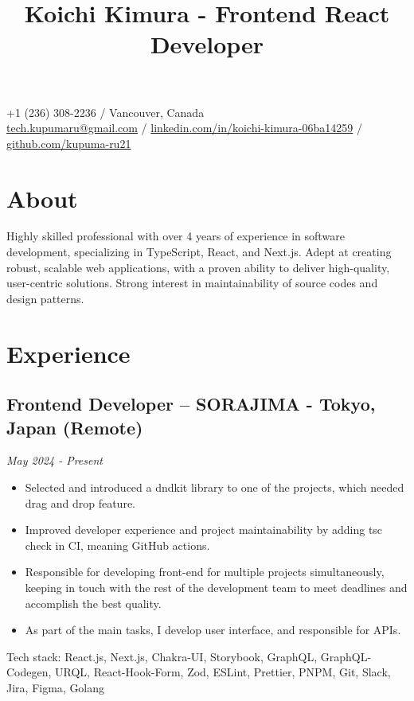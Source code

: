 \documentclass{article}
\title{Koichi Kimura - Frontend React Developer}
\date{}
\begin{document}
\maketitle

\begin{center}
+1 (236) 308-2236 / Vancouver, Canada \\
\href{mailto:tech.kupumaru@gmail.com}{tech.kupumaru@gmail.com} /
\href{https://www.linkedin.com/in/koichi-kimura-06ba14259}{linkedin.com/in/koichi-kimura-06ba14259} /
\href{https://github.com/kupuma-ru21}{github.com/kupuma-ru21}
\end{center}

\section*{About}
Highly skilled professional with over 4 years of experience in software development, specializing in TypeScript, React, and Next.js. Adept at creating robust, scalable web applications, with a proven ability to deliver high-quality, user-centric solutions. Strong interest in maintainability of source codes and design patterns.

\section*{Experience}

\subsection*{Frontend Developer – SORAJIMA - Tokyo, Japan (Remote)}
\textit{May 2024 - Present}
\begin{itemize}[leftmargin=*, itemsep=0pt]
    \item Selected and introduced a dndkit library to one of the projects, which needed drag and drop feature.
    \item Improved developer experience and project maintainability by adding tsc check in CI, meaning GitHub actions.
    \item Responsible for developing front-end for multiple projects simultaneously, keeping in touch with the rest of the development team to meet deadlines and accomplish the best quality.
    \item As part of the main tasks, I develop user interface, and responsible for APIs.
\end{itemize}
Tech stack: React.js, Next.js, Chakra-UI, Storybook, GraphQL, GraphQL-Codegen, URQL, React-Hook-Form, Zod, ESLint, Prettier, PNPM, Git, Slack, Jira, Figma, Golang
\end{document}
